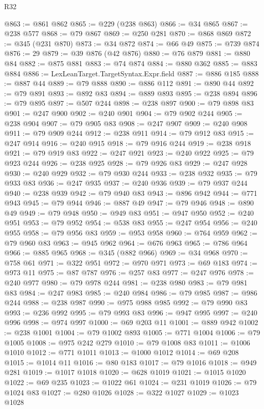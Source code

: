 \begin{lexlean}{R32}
\begin{coremodule}
@863 := @861 @862
@865 := @229 (@238 @863)
@866 := @34 @865
@867 := @238 @577
@868 := @79 @867
@869 := @250 @281
@870 := @868 @869
@872 := @345 (@231 @870)
@873 := @34 @872
@874 := @66 @49
@875 := @739 @874
@876 := 29
@879 := @39 @876 (@42 @876)
@880 := @76 @879
@881 := @880 @84
@882 := @875 @881
@883 := @74 @874
@884 := @880 @362
@885 := @883 @884
@886 := LexLeanTarget.TargetSyntax.Expr.field
@887 := @886 @185
@888 := @887 @44
@889 := @79 @888
@890 := @886 @112
@891 := @890 @44
@892 := @79 @891
@893 := @892 @83
@894 := @889 @893
@895 := @238 @894
@896 := @79 @895
@897 := @507 @244
@898 := @238 @897
@900 := @79 @898 @83
@901 := @247 @900
@902 := @240 @901
@904 := @79 @902 @244
@905 := @238 @904
@907 := @79 @905 @83
@908 := @247 @907
@909 := @240 @908
@911 := @79 @909 @244
@912 := @238 @911
@914 := @79 @912 @83
@915 := @247 @914
@916 := @240 @915
@918 := @79 @916 @244
@919 := @238 @918
@921 := @79 @919 @83
@922 := @247 @921
@923 := @240 @922
@925 := @79 @923 @244
@926 := @238 @925
@928 := @79 @926 @83
@929 := @247 @928
@930 := @240 @929
@932 := @79 @930 @244
@933 := @238 @932
@935 := @79 @933 @83
@936 := @247 @935
@937 := @240 @936
@939 := @79 @937 @244
@940 := @238 @939
@942 := @79 @940 @83
@943 := @896 @942
@944 := @771 @943
@945 := @79 @944
@946 := @887 @49
@947 := @79 @946
@948 := @890 @49
@949 := @79 @948
@950 := @949 @83
@951 := @947 @950
@952 := @240 @951
@953 := @79 @952
@954 := @538 @83
@955 := @247 @954
@956 := @240 @955
@958 := @79 @956 @83
@959 := @953 @958
@960 := @764 @959
@962 := @79 @960 @83
@963 := @945 @962
@964 := @676 @963
@965 := @786 @964
@966 := @885 @965
@968 := @345 (@882 @966)
@969 := @34 @968
@970 := @758 @61
@971 := @322 @951
@972 := @970 @971
@973 := @69 @183
@974 := @973 @11
@975 := @87 @787
@976 := @257 @83
@977 := @247 @976
@978 := @240 @977
@980 := @79 @978 @244
@981 := @238 @980
@983 := @79 @981 @83
@984 := @247 @983
@985 := @240 @984
@986 := @79 @985
@987 := @986 @244
@988 := @238 @987
@990 := @975 @988 @985
@992 := @79 @990 @83
@993 := @236 @992
@995 := @79 @993 @83
@996 := @947 @995
@997 := @240 @996
@998 := @974 @997
@1000 := @69 @203 @11
@1001 := @889 @942
@1002 := @238 @1001
@1004 := @79 @1002 @893
@1005 := @771 @1004
@1006 := @79 @1005
@1008 := @975 @242 @279
@1010 := @79 @1008 @83
@1011 := @1006 @1010
@1012 := @771 @1011
@1013 := @1000 @1012
@1014 := @69 @208
@1015 := @1014 @11
@1016 := @80 @183
@1017 := @79 @1016
@1018 := @949 @281
@1019 := @1017 @1018
@1020 := @628 @1019
@1021 := @1015 @1020
@1022 := @69 @235
@1023 := @1022 @61
@1024 := @231 @1019
@1026 := @79 @1024 @83
@1027 := @280 @1026
@1028 := @322 @1027
@1029 := @1023 @1028

\end{coremodule}
\end{lexlean}

